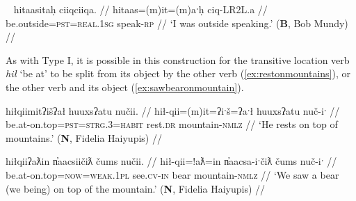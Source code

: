 \ex~ \label{ex:speakoutside}
\begingl
\glpreamble hitaasitaḥ ciiqciiqa. //
\gla hitaas=(m)it=(m)aˑḥ ciq-LR2L.a //
\glb be.outside=\textsc{pst}=\textsc{real.1sg} speak-\textsc{rp} //
\glft `I was outside speaking.' (\textbf{B}, Bob Mundy) //
\endgl
\xe

\begin{comment}
\ex~ \label{ex:speakoutside}
\begingl
\glpreamble qiiʔaƛintiis mamuuk ƛ̓aaʔaas. //
\gla qii=!aƛ=int=iis mamuuk ƛ̓aaʔaas //
\glb long.time=\textsc{now}=\textsc{pst}=\textsc{weak.1sg} work.\textsc{dr} be.outside //
\glft `I was working outside for a long time.' (\textbf{Q}, Sophie Billy) //
\endgl
\xe

\ex~ \label{ex:hideonroof}
\begingl
\glpreamble haptsaapaqƛiis suutił hiłaayiłkʷ. //
\gla hapt-saˑp=ʔaqƛ=iis sut-L.(č)ił hił-aˑyił=uk. //
\glb hide-\textsc{mo.caus}=\textsc{fut}=\textsc{weak.1sg} \textsc{2sg}-do.to be.at-on.a.roof=\textsc{poss} //
\glft `I will hide you on the roof.' (\textbf{Q}, Sophie Billy) //
\endgl
\xe
\end{comment}

As with Type I, it is possible in this construction for the transitive location verb \textit{hił} `be at' to be split from its object by the other verb (\ref{ex:restonmountains}), or the other verb and its object (\ref{ex:sawbearonmountain}).

\ex \label{ex:restonmountains}
\begingl
\glpreamble hiłqiimitʔišʔał huuxsʔatu nučii. //
\gla hił-qii=(m)it=ʔiˑš=ʔaˑł huuxsʔatu nuč-iˑ //
\glb be.at-on.top=\textsc{pst}=\textsc{strg.3}=\textsc{habit} rest.\textsc{dr} mountain-\textsc{nmlz} //
\glft `He rests on top of mountains.' (\textbf{N}, Fidelia Haiyupis) //
\endgl
\xe

\ex \label{ex:sawbearonmountain}
\begingl
\glpreamble hiłqiiʔaƛin n̓aacsiičiƛ čums nučii. //
\gla hił-qii=!aƛ=in n̓aacsa-iˑčiƛ čums nuč-iˑ //
\glb be.at-on.top=\textsc{now}=\textsc{weak.1pl} see.\textsc{cv}-\textsc{in} bear mountain-\textsc{nmlz} //
\glft `We saw a bear (we being) on top of the mountain.' (\textbf{N}, Fidelia Haiyupis) //
\endgl
\xe

\begin{comment}
\ex~ \label{ex:hiddeninthewall}
\begingl
\glpreamble huptsaapckʷaƛ hinałc̓ił ʔiiḥmisukʔi p̓atquk. //
\gla hupt-saˑp=ckʷiˑ=!aƛ hina-ałc̓ił ʔiiḥmis=uk=ʔiˑ p̓atquk //
\glb hide-\textsc{mo.caus}=remains.of=\textsc{now} \textsc{empty}-in.wall important=\textsc{poss}=\textsc{art} belongings //
\glft `They hid their belongings in the walls.' (\textbf{B}, Bob Mundy) //
\endgl
\xe
\end{comment}

